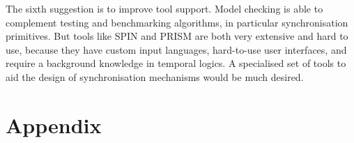 \documentclass[a4paper, 10pt]{article}
\begin{document}
The sixth suggestion is to improve tool support. Model checking is able to complement testing and benchmarking algorithms, in particular synchronisation primitives. But tools like SPIN and PRISM are both very extensive and hard to use, because they have custom input languages, hard-to-use user interfaces, and require a background knowledge in temporal logics. A specialised set of tools to aid the design of synchronisation mechanisms would be much desired.

\appendix

\pagebreak
\section{Appendix}
\label{sec:appendix}
\end{document}
